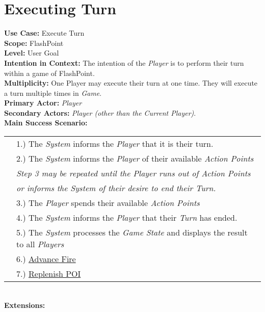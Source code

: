 \documentclass{article}
\begin{document}
	\section*{Executing Turn}
	\textbf{Use Case:} Execute Turn\\
	\textbf{Scope:} FlashPoint\\
	\textbf{Level:} User Goal\\
	\textbf{Intention in Context: } The intention of the \textit{Player} is to perform their turn within a game of FlashPoint.\\
	\textbf{Multiplicity: } One Player may execute their turn at one time. They will execute a turn multiple times in \textit{Game}.\\
	\textbf{Primary Actor:} \textit{Player} \\
	\textbf{Secondary Actors:} \textit{Player (other than the Current Player)}.\\
	\textbf{Main Success Scenario:}\\
	\begin{tabular}{l l}
		&1.) The \textit{System} informs the \textit{Player} that it is their turn.\\
		&2.) The \textit{System} informs the \textit{Player} of their available \textit{Action Points}\\
		&\textit{Step 3 may be repeated until the Player runs out of Action Points}\\
		&\qquad \textit{or informs the System of their desire to end their Turn.}\\
		&3.) The \textit{Player} spends their available \textit{Action Points}\\
		&4.) The \textit{System} informs the \textit{Player} that their \textit{Turn} has ended.\\
		&5.) The \textit{System} processes the \textit{Game State} and displays the result to all \textit{Players}\\
		&6.) \underline{Advance Fire}\\
		&7.) \underline{Replenish POI}\\
	\end{tabular}\\
	\textbf{Extensions: }\\
\end{document}
